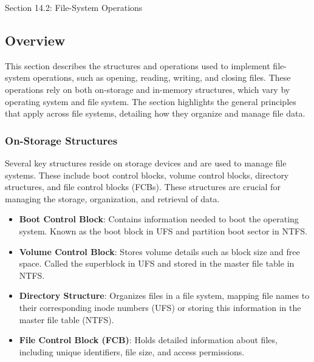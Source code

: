 \begin{notes}{Section 14.2: File-System Operations}
    \subsection*{Overview}

    This section describes the structures and operations used to implement file-system operations, such as opening, reading, writing, and closing files. These operations rely on both on-storage and in-memory structures, which vary by operating system and file system. The section highlights the general principles that apply across file systems, detailing how they organize and manage file data.
    
    \subsubsection*{On-Storage Structures}
    
    Several key structures reside on storage devices and are used to manage file systems. These include boot control blocks, volume control blocks, directory structures, and file control blocks (FCBs). These structures are crucial for managing the storage, organization, and retrieval of data.
    
    \begin{highlight}
    
        \begin{itemize}
            \item \textbf{Boot Control Block}: Contains information needed to boot the operating system. Known as the boot block in UFS and partition boot sector in NTFS.
            \item \textbf{Volume Control Block}: Stores volume details such as block size and free space. Called the superblock in UFS and stored in the master file table in NTFS.
            \item \textbf{Directory Structure}: Organizes files in a file system, mapping file names to their corresponding inode numbers (UFS) or storing this information in the master file table (NTFS).
            \item \textbf{File Control Block (FCB)}: Holds detailed information about files, including unique identifiers, file size, and access permissions.
        \end{itemize}
    
    \end{highlight}
    

\end{notes}
